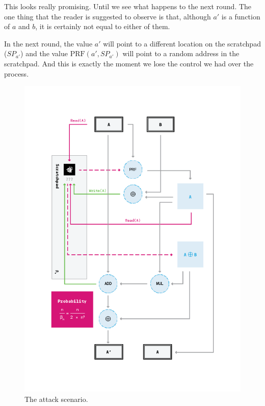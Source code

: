 This looks really promising. Until we see what happens to the next round. The one thing that the reader is suggested to observe is that, although $a'$ is a function of $a$ and $b$, it is certainly not equal to either of them.

In the next round, the value $a'$ will point to a different location on the scratchpad ($SP_{a'}$) and the value $\mbox{PRF}(a', SP_{a'})$ will point to a random address in the scratchpad. And this is exactly the moment we lose the control we had over the process.
\clearpage

\begin{figure}[H]
  \centering
  \includegraphics[scale=0.65, keepaspectratio]{Images/Bill/attack.png}
  \caption{The attack scenario.~\cite{bill}}
  \label{fig:attack}
\end{figure}
